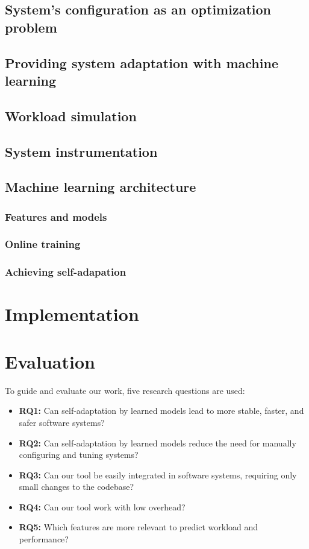 \subsection{System's configuration as an optimization problem}

\subsection{Providing system adaptation with machine learning}

\subsection{Workload simulation}

\subsection{System instrumentation}

\subsection{Machine learning architecture}

\subsubsection{Features and models}

\subsubsection{Online training}

\subsubsection{Achieving self-adapation}

\section{Implementation}

\section{Evaluation}

To guide and evaluate our work, five research questions are used:

\begin{itemize}
  \item \textbf{RQ1:} Can self-adaptation by learned models lead to more stable, faster, and safer software systems?
  \item \textbf{RQ2:} Can self-adaptation by learned models reduce the need for manually configuring and tuning systems?
  \item \textbf{RQ3:} Can our tool be easily integrated in software systems, requiring only small changes to the codebase?
  \item \textbf{RQ4:} Can our tool work with low overhead?
  \item \textbf{RQ5:} Which features are more relevant to predict workload and performance?
\end{itemize}

